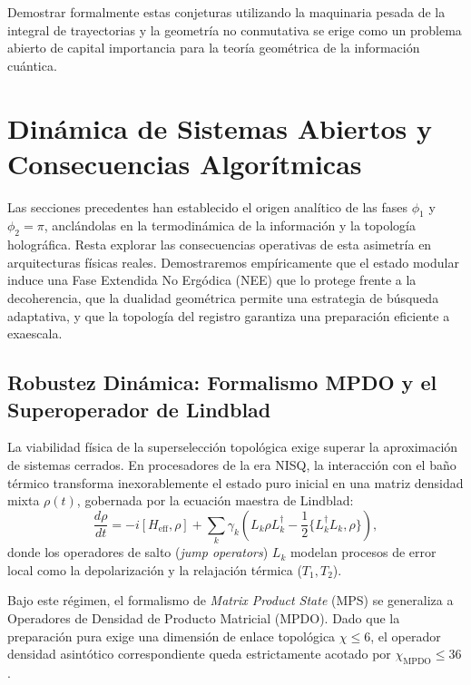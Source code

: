 \documentclass[12pt,a4paper]{article}
\theoremstyle{plain}
\theoremstyle{definition}
\theoremstyle{remark}
\begin{document}
Demostrar formalmente estas conjeturas utilizando la maquinaria pesada de la integral de trayectorias y la geometría no conmutativa se erige como un problema abierto de capital importancia para la teoría geométrica de la información cuántica.

\section{Dinámica de Sistemas Abiertos y Consecuencias Algorítmicas}
\label{sec:consecuencias}

Las secciones precedentes han establecido el origen analítico de las fases $\phi_1$ y $\phi_2 = \pi$, anclándolas en la termodinámica de la información y la topología holográfica. Resta explorar las consecuencias operativas de esta asimetría en arquitecturas físicas reales. Demostraremos empíricamente que el estado modular induce una Fase Extendida No Ergódica (NEE) que lo protege frente a la decoherencia, que la dualidad geométrica permite una estrategia de búsqueda adaptativa, y que la topología del registro garantiza una preparación eficiente a exaescala.

\subsection{Robustez Dinámica: Formalismo MPDO y el Superoperador de Lindblad}
\label{subsec:robustez_dinamica}

La viabilidad física de la superselección topológica exige superar la aproximación de sistemas cerrados. En procesadores de la era NISQ, la interacción con el baño térmico transforma inexorablemente el estado puro inicial en una matriz densidad mixta $\rho(t)$, gobernada por la ecuación maestra de Lindblad:
\begin{equation}
\frac{d\rho}{dt} = -i[H_{\text{eff}}, \rho] + \sum_k \gamma_k \left( L_k \rho L_k^\dagger - \frac{1}{2} \{L_k^\dagger L_k, \rho\} \right),
\end{equation}
donde los operadores de salto (\textit{jump operators}) $L_k$ modelan procesos de error local como la depolarización y la relajación térmica ($T_1, T_2$).

Bajo este régimen, el formalismo de \textit{Matrix Product State} (MPS) se generaliza a Operadores de Densidad de Producto Matricial (MPDO). Dado que la preparación pura exige una dimensión de enlace topológica $\chi \le 6$, el operador densidad asintótico correspondiente queda estrictamente acotado por $\chi_{\text{MPDO}} \le 36$.
\end{document}
